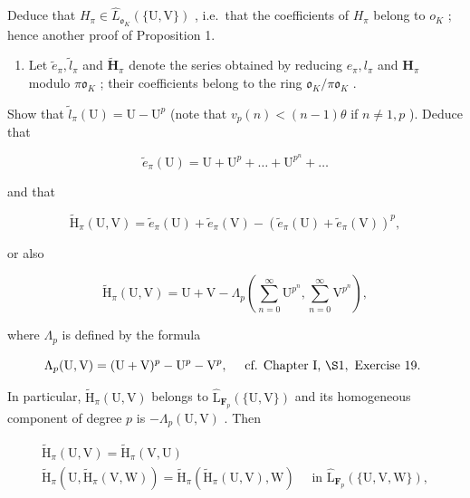 Deduce that \(H_{\pi} \in \hat{L}_{\mathfrak{o}_{K}}(\{\mathrm{U}, \mathrm{V}\})\) , i.e.~that the coefficients of \(H_{\pi}\) belong to \(o_{K}\) ; hence another proof of Proposition 1.

\begin{enumerate}
\def\labelenumi{(\alph{enumi})}
\setcounter{enumi}{3}
\tightlist
\item
  Let \(\tilde{e}_{\pi}, \tilde{l}_{\pi}\) and \(\tilde{\mathbf{H}}_{\pi}\) denote the series obtained by reducing \(e_{\pi}, l_{\pi}\) and \(\mathbf{H}_{\pi}\) modulo \(\pi \mathfrak{o}_{K}\) ; their coefficients belong to the ring \(\mathfrak{o}_{K} / \pi \mathfrak{o}_{K}\) .
\end{enumerate}

Show that \(\tilde{l}_{\pi}(\mathrm{U}) = \mathrm{U} - \mathrm{U}^{p}\) (note that \(v_{p}(n) < (n - 1)\theta\) if \(n \neq 1, p\) ). Deduce that

\[
\tilde {e} _ {\pi} (\mathrm{U}) = \mathrm{U} + \mathrm{U} ^ {p} + \dots + \mathrm{U} ^ {p ^ {n}} + \dots
\]

and that

\[
\tilde {\mathrm{H}} _ {\pi} (\mathrm{U}, \mathrm{V}) = \tilde {e} _ {\pi} (\mathrm{U}) + \tilde {e} _ {\pi} (\mathrm{V}) - (\tilde {e} _ {\pi} (\mathrm{U}) + \tilde {e} _ {\pi} (\mathrm{V})) ^ {p},
\]

or also

\[
\tilde {\mathrm{H}} _ {\pi} (\mathrm{U}, \mathrm{V}) = \mathrm{U} + \mathrm{V} - \Lambda_ {p} \left(\sum_ {n = 0} ^ {\infty} \mathrm{U} ^ {p ^ {n}}, \sum_ {n = 0} ^ {\infty} \mathrm{V} ^ {p ^ {n}}\right),
\]

where \(\Lambda_{p}\) is defined by the formula

\[
\Lambda_ {p} (\mathrm{U}, \mathrm{V}) = (\mathrm{U} + \mathrm{V}) ^ {p} - \mathrm{U} ^ {p} - \mathrm{V} ^ {p}, \quad \text { cf.   Chapter   I,   } \S 1, \text {   Exercise   19. }
\]

In particular, \(\tilde{\mathrm{H}}_{\pi}(\mathrm{U},\mathrm{V})\) belongs to \(\hat{\mathrm{L}}_{\mathbf{F}_{p}}(\{\mathrm{U},\mathrm{V}\})\) and its homogeneous component of degree \(p\) is \(-\Lambda_p(\mathrm{U},\mathrm{V})\) . Then

\[
\begin{array}{c} \tilde {\mathrm{H}} _ {\pi} (\mathrm{U}, \mathrm{V}) = \tilde {\mathrm{H}} _ {\pi} (\mathrm{V}, \mathrm{U}) \\ \tilde {\mathrm{H}} _ {\pi} (\mathrm{U}, \tilde {\mathrm{H}} _ {\pi} (\mathrm{V}, \mathrm{W})) = \tilde {\mathrm{H}} _ {\pi} (\tilde {\mathrm{H}} _ {\pi} (\mathrm{U}, \mathrm{V}), \mathrm{W}) \quad \text { in } \hat {\mathrm{L}} _ {\mathbf {F} _ {p}} (\{\mathrm{U}, \mathrm{V}, \mathrm{W} \}), \end{array}
\]

